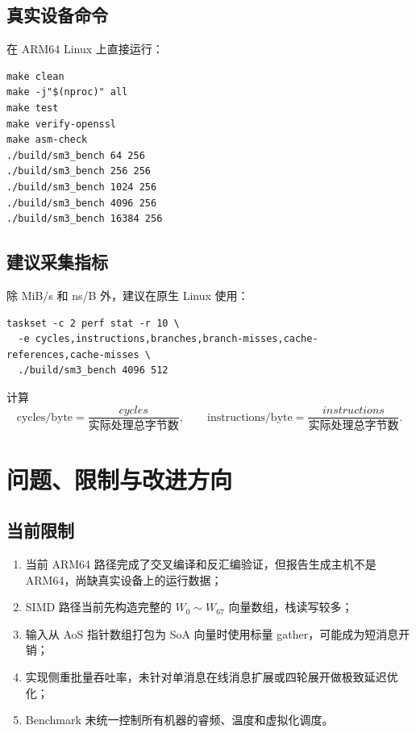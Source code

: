\documentclass[UTF8,a4paper,12pt]{ctexart}
\begin{document}
\subsection{真实设备命令}
在 ARM64 Linux 上直接运行：
\begin{lstlisting}[style=shellstyle,caption={ARM64 原生测试命令}]
make clean
make -j"$(nproc)" all
make test
make verify-openssl
make asm-check
./build/sm3_bench 64 256
./build/sm3_bench 256 256
./build/sm3_bench 1024 256
./build/sm3_bench 4096 256
./build/sm3_bench 16384 256
\end{lstlisting}

\subsection{建议采集指标}
除 MiB/s 和 ns/B 外，建议在原生 Linux 使用：
\begin{lstlisting}[style=shellstyle,caption={ARM64 perf 采集示例}]
taskset -c 2 perf stat -r 10 \
  -e cycles,instructions,branches,branch-misses,cache-references,cache-misses \
  ./build/sm3_bench 4096 512
\end{lstlisting}
计算
\begin{equation}
\mathrm{cycles/byte}=\frac{cycles}{\text{实际处理总字节数}},\qquad
\mathrm{instructions/byte}=\frac{instructions}{\text{实际处理总字节数}}.
\end{equation}

\section{问题、限制与改进方向}

\subsection{当前限制}
\begin{enumerate}
  \item 当前 ARM64 路径完成了交叉编译和反汇编验证，但报告生成主机不是 ARM64，尚缺真实设备上的运行数据；
  \item SIMD 路径当前先构造完整的 $W_0\sim W_{67}$ 向量数组，栈读写较多；
  \item 输入从 AoS 指针数组打包为 SoA 向量时使用标量 gather，可能成为短消息开销；
  \item 实现侧重批量吞吐率，未针对单消息在线消息扩展或四轮展开做极致延迟优化；
  \item Benchmark 未统一控制所有机器的睿频、温度和虚拟化调度。
\end{enumerate}
\end{document}
